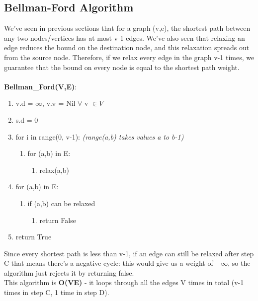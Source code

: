 \subsection{Bellman-Ford Algorithm}
We've seen in previous sections that for a graph (v,e), the shortest path between any two nodes/vertices has at most v-1 edges. We've also seen that relaxing an edge reduces the bound on the destination node, and this relaxation spreads out from the source node. Therefore, if we relax every edge in the graph v-1 times, we guarantee that the bound on every node is equal to the shortest path weight. \\ \\
\textbf{Bellman\_Ford(V,E)}:
\begin{enumerate}[label=\Alph*]
    \item v.d = $\infty$, v.$\pi$ = Nil $\forall$ v $\in V$
    \item s.d = 0
    \item for i in range(0, v-1): \emph{(range(a,b) takes values a to b-1)}
\begin{enumerate}[label=\arabic*]
    \item [] for (a,b) in E:
    \begin{enumerate}
        \item [] relax(a,b)
    \end{enumerate}
\end{enumerate}    
    \item for (a,b) in E:
\begin{enumerate}[label=\arabic*]
    \item [] if (a,b) can be relaxed
    \begin{enumerate}
        \item [] return False
    \end{enumerate}
\end{enumerate}  
    \item return True
\end{enumerate}
Since every shortest path is less than v-1, if an edge can still be relaxed after step C that means there's a negative cycle: this would give us a weight of $-\infty$, so the algorithm just rejects it by returning false.\\
This algorithm is \textbf{O(VE)} - it loops through all the edges V times in total (v-1 times in step C, 1 time in step D).

